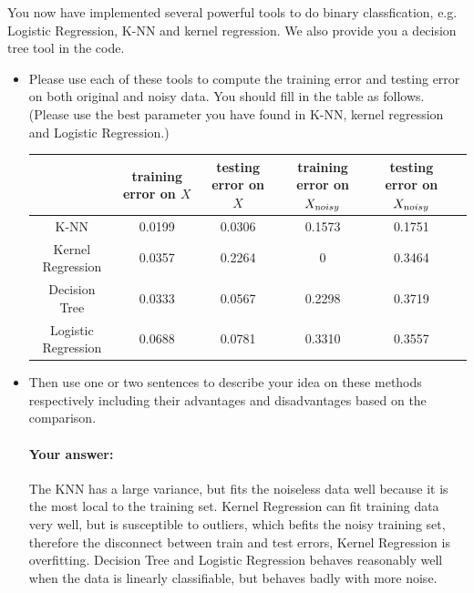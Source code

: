 \documentclass[english]{article}
\begin{document}
You now have implemented several powerful tools to do binary
classfication, e.g. Logistic Regression, K-NN and kernel regression.
We also provide you a decision tree tool in the code.

\begin{itemize}

\item Please use each of these tools to compute the training error and testing error on both original and noisy data. You should fill in the table as follows. (Please use the best parameter you have found in K-NN, kernel regression and Logistic Regression.)


\begin{table}[!htb]
\centering
\begin{tabular}{|c|c|c|c|c|c|} \hline
&training error on $X$& testing error on $X$&training error on $X_{\text noisy}$&testing error on $X_{\text noisy}$\\ \hline
K-NN&0.0199&0.0306&0.1573&0.1751\\ \hline
Kernel Regression &0.0357&0.2264&0&0.3464\\ \hline
Decision Tree&0.0333&0.0567&0.2298&0.3719 \\ \hline
Logistic Regression &0.0688&0.0781&0.3310&0.3557\\ \hline
\end{tabular}
\end{table} 

\item Then use one or two sentences to describe your idea on these methods respectively including their advantages and disadvantages based on the comparison. 

\paragraph{Your answer:}
 The KNN has a large variance, but fits the noiseless data well because it is the most local to the training set. Kernel Regression can fit training data very well, but is susceptible to outliers, which befits the noisy training set, therefore the disconnect between train and test errors, Kernel Regression is overfitting. Decision Tree and Logistic Regression behaves reasonably well when the data is linearly classifiable, but behaves badly with more noise.\\
 
\end{itemize}
\end{document}
